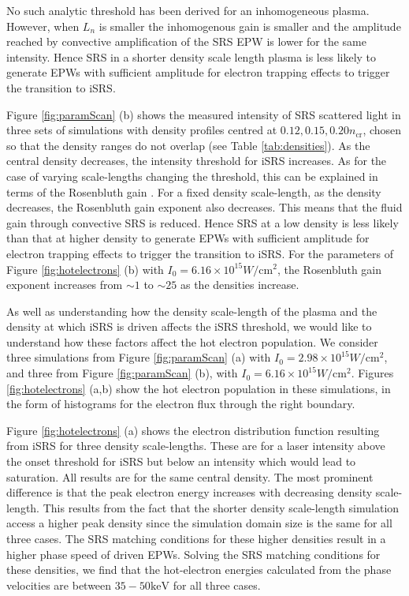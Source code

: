 No such analytic threshold has been derived for an inhomogeneous plasma.
However, when $L_n$ is smaller the inhomogenous gain is smaller and the amplitude reached by convective amplification of the SRS EPW is lower for the same intensity.
Hence SRS in a shorter density scale length plasma is less likely to generate EPWs with sufficient amplitude for electron trapping effects to trigger the transition to iSRS.

Figure \ref{fig:paramScan} (b) shows the measured intensity of SRS scattered light in three sets of simulations with density profiles centred at $0.12,0.15,0.20 n_\mathrm{cr}$, chosen so that the density ranges do not overlap (see Table \ref{tab:densities}). As the central density decreases, the intensity threshold for iSRS increases. As for the case of varying scale-lengths changing the threshold, this can be explained in terms of the Rosenbluth gain \citep{Rosenbluth1972}. For a fixed density scale-length, as the density decreases, the Rosenbluth gain exponent also decreases. This means that the fluid gain through convective SRS is reduced. Hence SRS at a low density is less likely than that at higher density to generate EPWs with sufficient amplitude for electron trapping effects to trigger the transition to iSRS. For the parameters of Figure \ref{fig:hotelectrons} (b) with $I_0 = 6.16\times 10^{15} \si{W / \centi \metre^2}$, the Rosenbluth gain exponent increases from $\sim1$ to $\sim25$ as the densities increase.



As well as understanding how the density scale-length of the plasma and the
density at which iSRS is driven affects the iSRS threshold, we would like to
understand how these factors affect the hot electron
population. We consider three simulations from Figure \ref{fig:paramScan} (a)
with $I_0 = 2.98\times 10^{15} \si{W / \centi \metre^2}$, and three from Figure
\ref{fig:paramScan} (b), with $I_0 = 6.16\times 10^{15} \si{W / \centi
\metre^2}$. Figures \ref{fig:hotelectrons} (a,b) show the hot electron
population in these simulations, in the form of histograms for the electron
flux through the right boundary.

Figure \ref{fig:hotelectrons} (a) shows the
electron distribution function resulting from iSRS for three density scale-lengths. These are for a laser intensity
above the onset threshold for iSRS but below an intensity which would lead to saturation. All results are
for the same central density. The most prominent difference is that the peak electron energy increases with
decreasing density scale-length. This results from the fact that the shorter density scale-length simulation
access a higher peak density since the simulation domain size is the same for all three cases. The SRS
matching conditions for these higher densities result in a higher phase speed of driven EPWs. Solving the
SRS matching conditions for these densities, we find that the hot-electron energies calculated from the phase
velocities are between $35 - 50 \si{\kilo \electronvolt}$ for all three cases.


